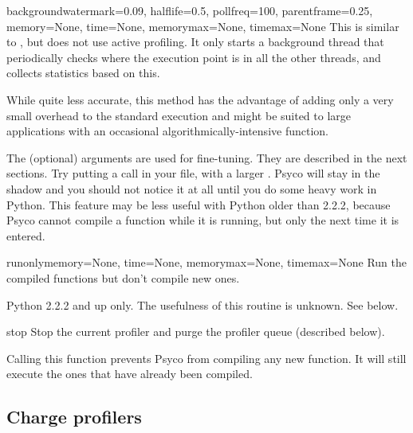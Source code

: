 \documentclass{manual}
\begin{document}
\begin{funcdesc}{background}{watermark=0.09, halflife=0.5, pollfreq=100, parentframe=0.25, memory=None, time=None, memorymax=None, timemax=None}
  This is similar to , but does not use active profiling.  It only starts a background thread that periodically checks where the execution point is in all the other threads, and collects statistics based on this.

  While quite less accurate, this method has the advantage of adding only a very small overhead to the standard execution and might be suited to large applications with an occasional algorithmically-intensive function.

  The (optional) arguments are used for fine-tuning.  They are described in the next sections.  Try putting a  call in your  file, with a larger .  Psyco will stay in the shadow and you should not notice it at all until you do some heavy work in Python.  This feature may be less useful with Python older than 2.2.2, because Psyco cannot compile a function while it is running, but only the next time it is entered.
\end{funcdesc}

\begin{funcdesc}{runonly}{memory=None, time=None, memorymax=None, timemax=None}
  Run the compiled functions but don't compile new ones.

  Python 2.2.2 and up only.  The usefulness of this routine is unknown.  See below.
\end{funcdesc}

\begin{funcdesc}{stop}{}
  Stop the current profiler and purge the profiler queue (described below).

  Calling this function prevents Psyco from compiling any new function.  It will still execute the ones that have already been compiled.
\end{funcdesc}



\subsection{Charge profilers}\label{charges}
\end{document}
